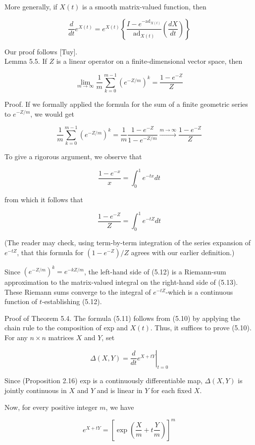 \documentclass[10pt, letterpaper]{article}
\begin{document}
More generally, if $X(t)$ is a smooth matrix-valued function, then

$$
\frac{d}{d t} e^{X(t)}=e^{X(t)}\left\{\frac{I-e^{-\mathrm{ad}_{X(t)}}}{\operatorname{ad}_{X(t)}}\left(\frac{d X}{d t}\right)\right\}
$$

Our proof follows [Tuy].\\
Lemma 5.5. If $Z$ is a linear operator on a finite-dimensional vector space, then

$$
\lim _{m \rightarrow \infty} \frac{1}{m} \sum_{k=0}^{m-1}\left(e^{-Z / m}\right)^{k}=\frac{1-e^{-Z}}{Z}
$$

Proof. If we formally applied the formula for the sum of a finite geometric series to $e^{-Z / m}$, we would get

$$
\frac{1}{m} \sum_{k=0}^{m-1}\left(e^{-Z / m}\right)^{k}=\frac{1}{m} \frac{1-e^{-Z}}{1-e^{-Z / m}} \xrightarrow{m \rightarrow \infty} \frac{1-e^{-Z}}{Z}
$$

To give a rigorous argument, we observe that

$$
\frac{1-e^{-x}}{x}=\int_{0}^{1} e^{-t x} d t
$$

from which it follows that

$$
\frac{1-e^{-Z}}{Z}=\int_{0}^{1} e^{-t Z} d t
$$

(The reader may check, using term-by-term integration of the series expansion of $e^{-t Z}$, that this formula for $\left(1-e^{-Z}\right) / Z$ agrees with our earlier definition.)

Since $\left(e^{-Z / m}\right)^{k}=e^{-k Z / m}$, the left-hand side of (5.12) is a Riemann-sum approximation to the matrix-valued integral on the right-hand side of (5.13). These Riemann sums converge to the integral of $e^{-t Z}$-which is a continuous function of $t$-establishing (5.12).

Proof of Theorem 5.4. The formula (5.11) follows from (5.10) by applying the chain rule to the composition of exp and $X(t)$. Thus, it suffices to prove (5.10). For any $n \times n$ matrices $X$ and $Y$, set

$$
\Delta(X, Y)=\left.\frac{d}{d t} e^{X+t Y}\right|_{t=0}
$$

Since (Proposition 2.16) exp is a continuously differentiable map, $\Delta(X, Y)$ is jointly continuous in $X$ and $Y$ and is linear in $Y$ for each fixed $X$.

Now, for every positive integer $m$, we have

$$
e^{X+t Y}=\left[\exp \left(\frac{X}{m}+t \frac{Y}{m}\right)\right]^{m}
$$
\end{document}
